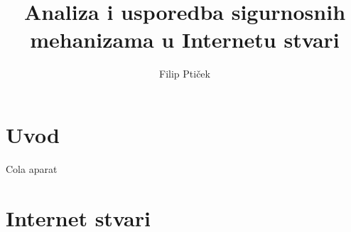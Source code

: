 \documentclass[times, utf8, diplomski]{fer}
\begin{document}

\title{Analiza i usporedba sigurnosnih mehanizama u Internetu stvari}

\author{Filip Ptiček}

\maketitle



\zahvala{}

\tableofcontents

\chapter{Uvod}
Cola aparat\citep{Coke}

\chapter{Internet stvari}
\end{document}
